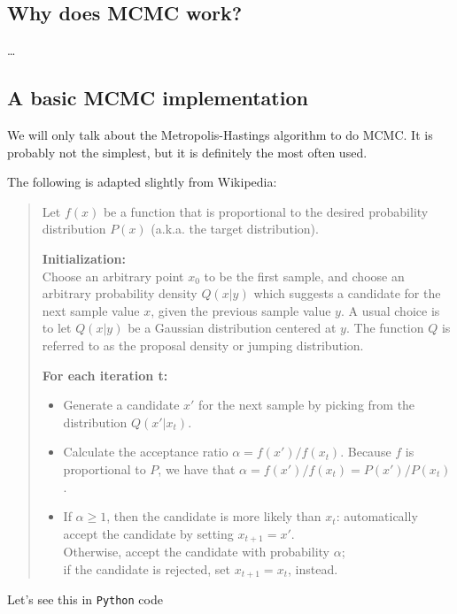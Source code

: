 \documentclass[a4paper,11pt]{article}
\begin{document}
\subsection{Why does MCMC work?}

  \ldots

\subsection{A basic MCMC implementation}

We will only talk about the Metropolis-Hastings algorithm to do MCMC.
It is probably not the simplest, but it is definitely the most often used.

\noindent The following is adapted slightly from Wikipedia:

\begin{quote}
   Let $f(x)$ be a function that is proportional to the desired probability distribution $P(x)$ (a.k.a. the target distribution).

    \textbf{Initialization:}\\
    Choose an arbitrary point $x_0$ to be the first sample, and choose an arbitrary probability density $Q(x|y)$ which suggests a candidate for the next sample value $x$, given the previous sample value $y$. A usual choice is to let $Q(x|y)$ be a Gaussian distribution centered at $y$. The function $Q$ is referred to as the proposal density or jumping distribution.

    \textbf{For each iteration t:}
    \begin{itemize}
      \item Generate a candidate $x'$ for the next sample by picking from the distribution $Q(x'|x_t)$.
      \item Calculate the acceptance ratio $\alpha = f(x')/f(x_t)$. Because $f$ is proportional to $P$, we have that $\alpha = f(x')/f(x_t) = P(x')/P(x_t)$.
      \item If $\alpha \geq 1$, then the candidate is more likely than $x_t$: automatically accept the candidate by setting $x_{t+1} = x'$. \\
      Otherwise, accept the candidate with probability $\alpha$;\\
      if the candidate is rejected, set $x_{t+1} = x_t$, instead.
\end{itemize}
\end{quote}

\noindent Let's see this in \texttt{Python} code
\end{document}
